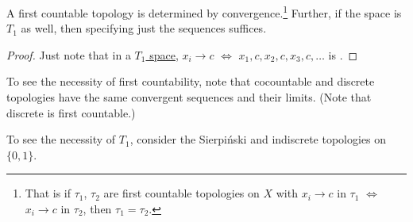 	\begin{cor}\label{COR: first countable T1 topologies via their sequences}
		A first countable topology is determined by convergence.\footnote{
			That is if $\tau_1$, $\tau_2$ are first countable topologies on $X$ with $x_i\to c$ in $\tau_1$ $\iff$ $x_i\to c$ in $\tau_2$, then $\tau_1 = \tau_2$.
		} Further, if the space is $T_1$ as well, then specifying just the \cgt sequences suffices.
	\end{cor}
	
	\begin{proof}
		Just note that in a \uline{$T_1$ space}, $x_i\to c$ $\iff$ $x_1, c, x_2, c, x_3, c, \ldots$ is \cgt.
	\end{proof}
	
	\begin{rmk}
		\begin{mylist}
			\item To see the necessity of first countability, note that cocountable and discrete topologies have the same convergent sequences and their limits. (Note that discrete is first countable.)
			
			\item To see the necessity of $T_1$, consider the Sierpiński and indiscrete topologies on $\{0, 1\}$.
		\end{mylist}
	\end{rmk}